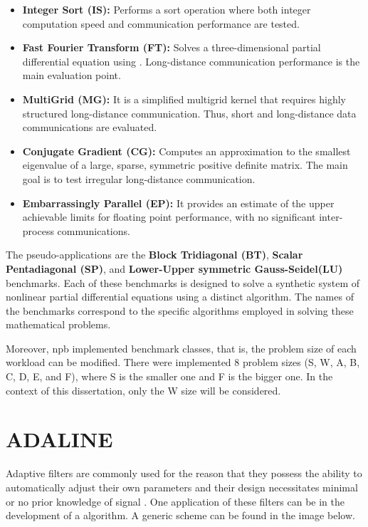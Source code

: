 \begin{itemize}
    \item \textbf{Integer Sort (IS):} Performs a sort operation where both integer computation speed and communication performance are tested.

    \item \textbf{Fast Fourier Transform (FT):} Solves a three-dimensional partial differential equation using . 
        Long-distance communication performance is the main evaluation point. 

    \item \textbf{MultiGrid (MG):} It is a simplified multigrid kernel that requires highly structured long-distance communication. Thus, short and 
        long-distance data communications are evaluated.

    \item \textbf{Conjugate Gradient (CG):} Computes an approximation to
    the smallest eigenvalue of a large, sparse, symmetric positive definite matrix. The main goal is to test irregular long-distance communication.

    \item \textbf{Embarrassingly Parallel (EP):} It provides an estimate of the
    upper achievable limits for floating point performance, with no significant inter-process communications.
\end{itemize}

The pseudo-applications are the \textbf{Block Tridiagonal (BT)}, \textbf{Scalar Pentadiagonal (SP)}, and 
\textbf{Lower-Upper symmetric Gauss-Seidel(LU)} benchmarks. Each of these benchmarks is designed to solve a synthetic system of nonlinear partial 
differential equations using a distinct algorithm. The names of the benchmarks correspond to the specific algorithms employed in solving these 
mathematical problems.

Moreover, \gls{npb} implemented benchmark classes, that is, the problem size of each workload can be modified. There were implemented 8 problem 
sizes (S, W, A, B, C, D, E, and F), where S is the smaller one and F is the bigger one. In the context of this dissertation, only the W size 
will be considered.

\section{ADALINE}

Adaptive filters are commonly used for the reason that they possess the ability to automatically adjust their own parameters and their 
design necessitates minimal or no prior knowledge of signal \cite{haykin1996linear}. One application of these filters can be in the development 
of a  algorithm. A generic scheme can be found in the image below.

